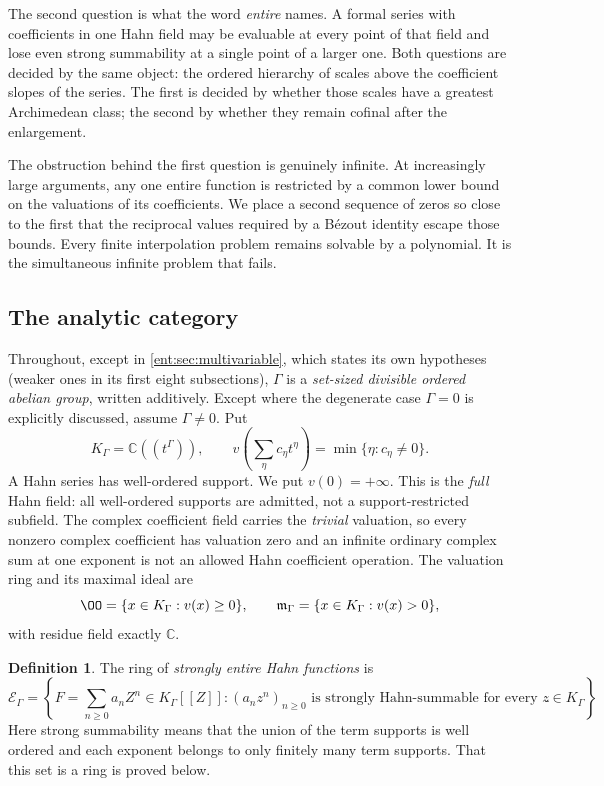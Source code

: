 \documentclass[11pt]{article}
\theoremstyle{plain}
\theoremstyle{plain}
\theoremstyle{plain}
\theoremstyle{definition}
\newtheorem{definition}[definition]{Definition}
\theoremstyle{definition}
\theoremstyle{definition}
\theoremstyle{definition}
\theoremstyle{remark}
\newcommand{\C}{\mathbb C}\newcommand{\R}{\mathbb R}
\newcommand{\K}{K_\Gamma}\newcommand{\KD}{K_\Delta}
\newcommand{\E}{\mathcal E_\Gamma}
\newcommand{\mm}{\mathfrak m_\Gamma}
\begin{document}
The second question is what the word \emph{entire} names. A formal series
with coefficients in one Hahn field may be evaluable at every point of that
field and lose even strong summability at a single point of a larger one.
Both questions are decided by the same object: the ordered hierarchy of
scales above the coefficient slopes of the series. The first is decided by
whether those scales have a greatest Archimedean class; the second by
whether they remain cofinal after the enlargement.

The obstruction behind the first question is genuinely infinite. At
increasingly large arguments, any one entire function is restricted by a
common lower bound on the valuations of its coefficients. We place a second
sequence of zeros so close to the first that the reciprocal values required
by a B\'ezout identity escape those bounds. Every finite interpolation
problem remains solvable by a polynomial. It is the simultaneous infinite
problem that fails.

\subsection{The analytic category}
Throughout, except in \cref{ent:sec:multivariable}, which states its own
hypotheses (weaker ones in its first eight subsections), $\Gamma$ is a \emph{set-sized divisible ordered abelian
group}, written additively. Except where the degenerate case $\Gamma=0$ is
explicitly discussed, assume $\Gamma\ne0$. Put
\[
 \K=\C((t^\Gamma)),\qquad
 v\left(\sum_\eta c_\eta t^\eta\right)=\min\{\eta:c_\eta\ne0\}.
\]
A Hahn series has well-ordered support. We put $v(0)=+\infty$. This is the
\emph{full} Hahn field: all well-ordered supports are admitted, not a
support-restricted subfield. The complex coefficient field carries the
\emph{trivial} valuation, so every nonzero complex coefficient has valuation
zero and an infinite ordinary complex sum at one exponent is not an allowed
Hahn coefficient operation. The valuation ring and its maximal ideal are
\[
 \OO=\{x\in\K:v(x)\ge0\},\qquad
 \mm=\{x\in\K:v(x)>0\},
\]
with residue field exactly $\C$.

\begin{definition}\label{ent:def:entire}
The ring of \emph{strongly entire Hahn functions} is
\[
 \E=\left\{F=\sum_{n\ge0}a_nZ^n\in\K[[Z]]:
       (a_nz^n)_{n\ge0}\text{ is strongly Hahn-summable for every }z\in\K
       \right\}.
\]
Here strong summability means that the union of the term supports is well
ordered and each exponent belongs to only finitely many term supports. That
this set is a ring is proved below.
\end{definition}
\end{document}
